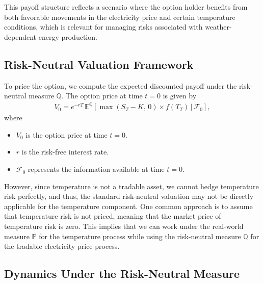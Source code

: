 \documentclass[10pt,a4paper,reqno]{amsart}
\theoremstyle{example}
\begin{document}
This payoff structure reflects a scenario where the option holder benefits from both favorable movements in the electricity price and certain temperature conditions, which is relevant for managing risks associated with weather-dependent energy production.

\subsection{Risk-Neutral Valuation Framework}

To price the option, we compute the expected discounted payoff under the risk-neutral measure $\mathbb{Q}$. The option price at time $t = 0$ is given by
\begin{align}
V_0 = e^{- r T} \, \mathbb{E}^{\mathbb{Q}} \left[ \max\left( S_T - K,\, 0 \right) \times f(T_T) \,\bigg|\, \mathcal{F}_0 \right], \label{eq:option_price}
\end{align}
where
\begin{itemize}
    \item $V_0$ is the option price at time $t = 0$.
    \item $r$ is the risk-free interest rate.
    \item $\mathcal{F}_0$ represents the information available at time $t = 0$.
\end{itemize}

However, since temperature is not a tradable asset, we cannot hedge temperature risk perfectly, and thus, the standard risk-neutral valuation may not be directly applicable for the temperature component. One common approach is to assume that temperature risk is not priced, meaning that the market price of temperature risk is zero. This implies that we can work under the real-world measure $\mathbb{P}$ for the temperature process while using the risk-neutral measure $\mathbb{Q}$ for the tradable electricity price process.

\subsection{Dynamics Under the Risk-Neutral Measure}
\end{document}

